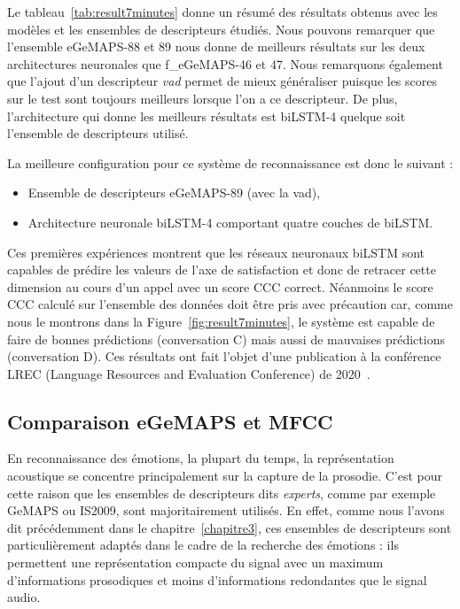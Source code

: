 

Le tableau~\ref{tab:result7minutes} donne un résumé des résultats obtenus avec les modèles et les ensembles de descripteurs étudiés.
Nous pouvons remarquer que l'ensemble eGeMAPS-88 et 89 nous donne de meilleurs résultats sur les deux architectures neuronales que f\_eGeMAPS-46 et 47. Nous remarquons également que l'ajout d'un descripteur \textit{vad} permet de mieux généraliser puisque les scores sur le test sont toujours meilleurs lorsque l'on a ce descripteur. De plus, l'architecture qui donne les meilleurs résultats est biLSTM-4 quelque soit l'ensemble de descripteurs utilisé.

La meilleure configuration pour ce système de reconnaissance est donc le suivant :

\begin{itemize}
  \item Ensemble de descripteurs eGeMAPS-89 (avec la vad),
  \item Architecture neuronale biLSTM-4 comportant quatre couches de biLSTM.
\end{itemize}

Ces premières expériences montrent que les réseaux neuronaux biLSTM sont capables de prédire les valeurs de l'axe de satisfaction et donc de retracer cette dimension au cours d’un appel avec un score CCC correct. Néanmoins le score CCC calculé sur l'ensemble des données doit être pris avec précaution car, comme nous le montrons dans la Figure~\ref{fig:result7minutes}, le système est capable de faire de bonnes prédictions (conversation C) mais aussi de mauvaises prédictions (conversation D). Ces résultats ont fait l'objet d'une publication à la conférence LREC (Language Resources and Evaluation Conference) de 2020~\cite{Macary2020allosat}.



\subsection{Comparaison eGeMAPS et MFCC}
En reconnaissance des émotions, la plupart du temps, la représentation acoustique se concentre principalement sur la capture de la prosodie. C'est pour cette raison que les ensembles de descripteurs dits \textit{experts}, comme par exemple GeMAPS ou IS2009, sont majoritairement utilisés. En effet, comme nous l'avons dit précédemment dans le chapitre~\ref{chapitre3}, ces ensembles de descripteurs sont particulièrement adaptés dans le cadre de la recherche des émotions : ils permettent une représentation compacte du signal avec un maximum d'informations prosodiques et moins d'informations redondantes que le signal audio.

